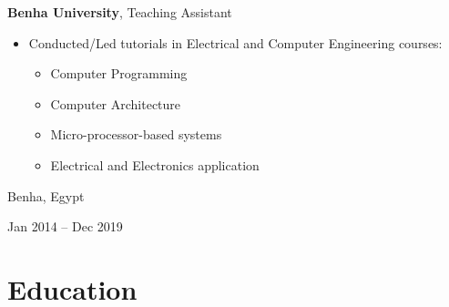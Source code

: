 \documentclass[10pt, letterpaper]{article}
\newenvironment{highlights}{
    \begin{itemize}[
        topsep=0.10 cm,
        parsep=0.10 cm,
        partopsep=0pt,
        itemsep=0pt,
        leftmargin=0.4 cm + 10pt
    ]
}{
    \end{itemize}
} %
\newenvironment{twocolentry}[2][]{
    \onecolentry
    \def\secondColumn{#2}
    \setcolumnwidth{\fill, 4.5 cm}
    \begin{paracol}{2}
}{
    \switchcolumn \raggedleft \secondColumn
    \end{paracol}
    \endonecolentry
} %
\begin{document}
 \begin{twocolentry}{
            Benha, Egypt

        Jan 2014 – Dec 2019
        }
            \textbf{Benha University}, Teaching Assistant           \begin{highlights}
            \item Conducted/Led tutorials in Electrical and Computer Engineering courses:
            \vspace{-0.5 cm}
            \begin{multicols}{2}
            \setlength{\itemsep}{20pt}
            \begin{itemize}[leftmargin=*]
                \item Computer Programming 
                \item Computer Architecture
            \end{itemize}
            
            \columnbreak
            
            \begin{itemize}[leftmargin=*]
                \item Micro-processor-based systems
                \item  Electrical and Electronics application

            \end{itemize}
            
            \columnbreak
            
           
            \end{multicols}
            \end{highlights}
        \end{twocolentry}
    \vspace{-0.6 cm} 





    
    \section{Education}
\end{document}
